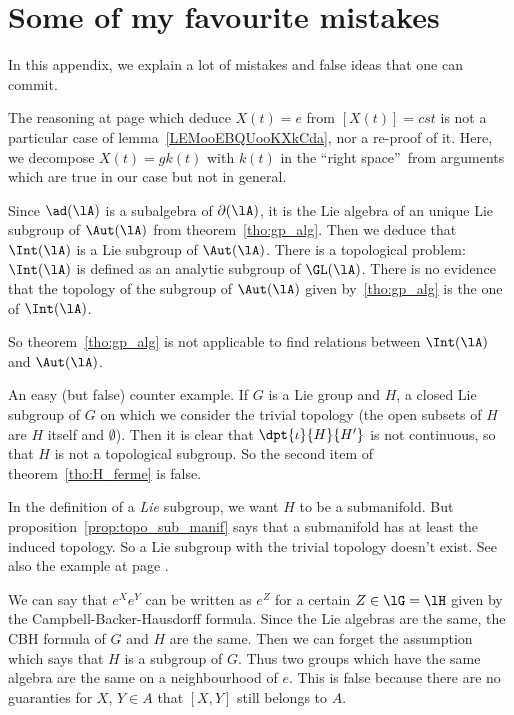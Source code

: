 \section{Some of my favourite mistakes}

In this appendix, we explain a lot of mistakes and false ideas that one can commit.

\begin{erreur}\label{err:decomp}
The reasoning at page \pageref{pg:X_t} which deduce $X(t)=e$ from $[X(t)]=cst$ is not a particular case of lemma~\ref{LEMooEBQUooKXkCda}, nor a re-proof of it. Here, we decompose $X(t)=gk(t)$ with $k(t)$ in the ``right space''\ from arguments which are true in our case but not in general.
\end{erreur}

\begin{erreur}\label{err:Intt_Aut}
Since $\ad(\lA)$ is a subalgebra of $\partial(\lA)$, it is the Lie algebra of an unique Lie subgroup of $\Aut(\lA)$ from theorem~\ref{tho:gp_alg}. Then we deduce that $\Int(\lA)$ is a Lie subgroup of $\Aut(\lA)$. There is a topological problem: $\Int(\lA)$ is defined as an analytic subgroup of $\GL(\lA)$. There is no evidence that the topology of the subgroup of $\Aut(\lA)$ given by~\ref{tho:gp_alg} is the one of $\Int(\lA)$.

So theorem~\ref{tho:gp_alg} is not applicable to find relations between $\Int(\lA)$ and $\Aut(\lA)$.
\end{erreur}

\begin{erreur}\label{err:gross}
An easy (but false) counter example. If $G$ is a Lie group and $H$, a closed Lie subgroup of $G$ on which we consider the trivial topology (the open subsets of $H$ are $H$ itself and $\emptyset$). Then it is clear that $\dpt{\iota}{H}{H'}$ is not continuous, so that $H$ is not a topological subgroup. So the second item of theorem~\ref{tho:H_ferme} is false.

In the definition of a \emph{Lie} subgroup, we want $H$ to be a submanifold. But proposition~\ref{prop:topo_sub_manif} says that a submanifold has at least the induced topology. So a Lie subgroup with the trivial topology doesn't exist. See also the example at page \pageref{pg:ex_topo_Lie}.
\end{erreur}

\begin{erreur}\label{err:gp_meme_alg}
We can say that $e^Xe^Y$ can be written as $e^Z$ for a certain $Z\in\lG=\lH$ given by the Campbell-Backer-Hausdorff formula. Since the Lie algebras are the same, the CBH formula of $G$ and $H$ are the same. Then we can forget the assumption which says that $H$ is a subgroup of $G$. Thus two groups which have the same algebra are the same on a neighbourhood of $e$. This is false because there are no guaranties for $X$, $Y\in A$ that $[X,Y]$ still belongs to $A$.
\end{erreur}


